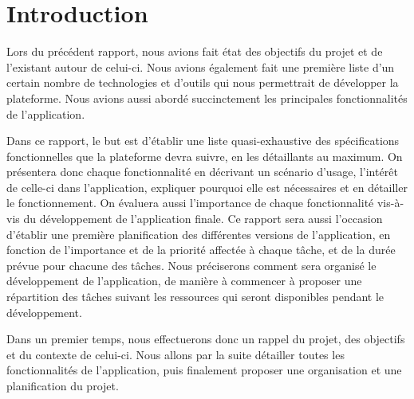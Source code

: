 \section{Introduction}
\label{sec:intro}

    Lors du précédent rapport, nous avions fait état des objectifs du projet et de l'existant autour de celui-ci. Nous avions également fait
    une première liste d'un certain nombre de technologies et d'outils qui nous permettrait de développer la plateforme. Nous avions aussi abordé
    succinctement les principales fonctionnalités de l'application.

    Dans ce rapport, le but est d'établir une liste quasi-exhaustive des spécifications fonctionnelles que la plateforme devra suivre,
    en les détaillants au maximum. On présentera donc chaque fonctionnalité en décrivant un scénario d'usage, l'intérêt de celle-ci
    dans l'application, expliquer pourquoi elle est nécessaires et en détailler le fonctionnement. On évaluera aussi l'importance de
    chaque fonctionnalité vis-à-vis du développement de l'application finale. Ce rapport sera aussi l'occasion d'établir une première
    planification des différentes versions de l'application, en fonction de l'importance et de la priorité affectée à chaque tâche,
    et de la durée prévue pour chacune des tâches. Nous préciserons comment sera organisé le développement de l'application, de manière
    à commencer à proposer une répartition des tâches suivant les ressources qui seront disponibles pendant le développement.

    Dans un premier temps, nous effectuerons donc un rappel du projet, des objectifs et du contexte de celui-ci. Nous allons par la suite
    détailler toutes les fonctionnalités de l'application, puis finalement proposer une organisation et une planification du projet.
